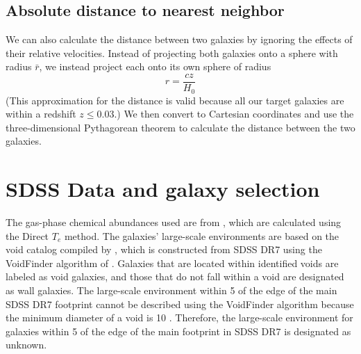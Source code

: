 \subsection{Absolute distance to nearest neighbor}

We can also calculate the distance between two galaxies by ignoring the effects 
of their relative velocities.  Instead of projecting both galaxies onto a sphere 
with radius $\bar{r}$, we instead project each onto its own sphere of radius 
\begin{equation}
    r = \frac{cz}{H_0}
\end{equation}
(This approximation for the distance is valid because all our target galaxies 
are within a redshift $z \leq 0.03$.)  We then convert to Cartesian coordinates 
and use the three-dimensional Pythagorean theorem to calculate the distance 
between the two galaxies.




\section[SDSS Data]{SDSS Data and galaxy selection}

The gas-phase chemical abundances used are from \cite{Douglass17c}, which are 
calculated using the Direct $T_e$ method.  The galaxies' large-scale 
environments are based on the void catalog compiled by \cite{Pan12}, which is 
constructed from SDSS DR7 using the VoidFinder algorithm of \cite{Hoyle02}.  
Galaxies that are located within identified voids are labeled as void galaxies, 
and those that do not fall within a void are designated as wall galaxies.  The 
large-scale environment within 5 \hMpc of the edge of the main SDSS DR7 
footprint cannot be described using the VoidFinder algorithm because the minimum 
diameter of a void is 10 \hMpc.  Therefore, the large-scale environment for 
galaxies within 5 \hMpc of the edge of the main footprint in SDSS DR7 is 
designated as unknown.

